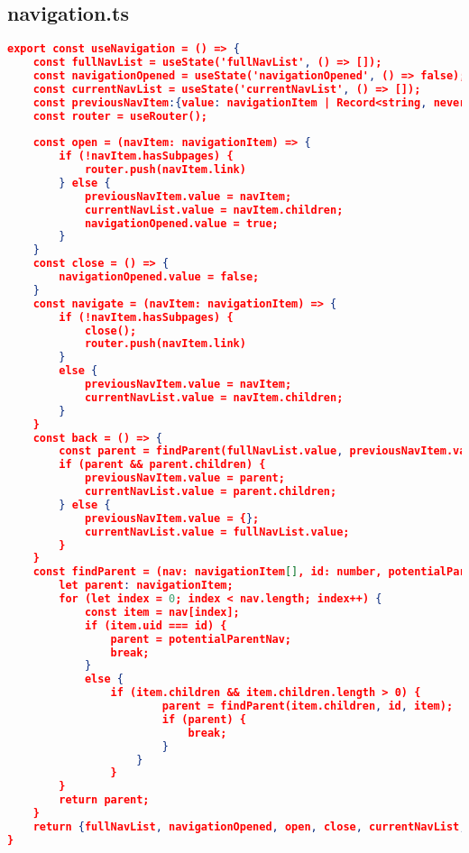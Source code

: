 \pagebreak

\subsection{navigation.ts}
\label{navigation.ts}

\begin{lstlisting}[language=json,firstnumber=1]
export const useNavigation = () => {
    const fullNavList = useState('fullNavList', () => []);
    const navigationOpened = useState('navigationOpened', () => false);
    const currentNavList = useState('currentNavList', () => []);
    const previousNavItem:{value: navigationItem | Record<string, never>} = useState('previousNavItem');
    const router = useRouter();
    
    const open = (navItem: navigationItem) => {
        if (!navItem.hasSubpages) {
            router.push(navItem.link)
        } else {
            previousNavItem.value = navItem;
            currentNavList.value = navItem.children;
            navigationOpened.value = true;  
        } 
    }
    const close = () => {
        navigationOpened.value = false;
    }
    const navigate = (navItem: navigationItem) => {
        if (!navItem.hasSubpages) {
            close();
            router.push(navItem.link)
        }
        else {
            previousNavItem.value = navItem;
            currentNavList.value = navItem.children;
        }
    }
    const back = () => {
        const parent = findParent(fullNavList.value, previousNavItem.value.uid);
        if (parent && parent.children) {
            previousNavItem.value = parent;
            currentNavList.value = parent.children;
        } else {
            previousNavItem.value = {};
            currentNavList.value = fullNavList.value;
        }
    }
    const findParent = (nav: navigationItem[], id: number, potentialParentNav?: navigationItem) => {
        let parent: navigationItem;
        for (let index = 0; index < nav.length; index++) {
            const item = nav[index];
            if (item.uid === id) {
                parent = potentialParentNav;
                break;
            } 
            else {
                if (item.children && item.children.length > 0) {
                        parent = findParent(item.children, id, item);
                        if (parent) {
                            break;
                        }
                    }
                }
        }
        return parent;
    }
    return {fullNavList, navigationOpened, open, close, currentNavList, previousNavItem, navigate, back};
}
\end{lstlisting}

